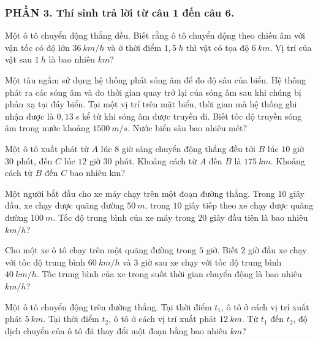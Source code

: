 \subsubsection*{PHẦN 3. Thí sinh trả lời từ câu 1 đến câu 6.}
\setcounter{ex}{0}
\begin{ex}%
Một ô tô chuyển động thẳng đều. Biết rằng ô tô chuyển động theo chiều âm với vận tốc có độ lớn $36\ km / h$ và ở thời điểm $1,5\ h$ thì vật có tọa độ $6\ km$. Vị trí của vật sau $1\ h$ là bao nhiêu $km$?
\loigiai{
}
\end{ex}
\begin{ex}%
Một tàu ngầm sử dụng hệ thống phát sóng âm để đo độ sâu của biển. Hệ thống phát ra các sóng âm và đo thời gian quay trở lại của sóng âm sau khi chúng bị phản xạ tại đáy biển. Tại một vị trí trên mặt biển, thời gian mà hệ thống ghi nhận được là $0,13\ s$ kể từ khi sóng âm được truyền đi. Biết tốc độ truyền sóng âm trong nước khoảng $1500\ m/s$. Nước biển sâu bao nhiêu mét? 
\loigiai{
}
\end{ex}
\begin{ex}%
Một ô tô xuất phát từ $A$ lúc $8$ giờ sáng chuyển động thẳng đều tới $B$ lúc $10$ giờ $30$ phút, đến $C$ lúc $12$ giờ $30$ phút. Khoảng cách từ $A$ đến $B$ là $175\ km$. Khoảng cách từ $B$ đến $C$ bao nhiêu km?
\loigiai{
}
\end{ex}
\begin{ex}
Một người bắt đầu cho xe máy chạy trên một đoạn đường thẳng. Trong $10$ giây đầu, xe chạy được quãng đường $50\ m$, trong $10$ giây tiếp theo xe chạy được quãng đường $100\ m$. Tốc độ trung bình của xe máy trong $20$ giây đầu tiên là bao nhiêu $km/h$?
\end{ex}
\begin{ex}
Cho một xe ô tô chạy trên một quãng đường trong $5$ giờ. Biết $2$ giờ đầu xe chạy với tốc độ trung bình $60\ km/h$ và $3$ giờ sau xe chạy với tốc độ trung bình $40\ km/h$. Tốc trung bình của xe trong suốt thời gian chuyển động là bao nhiêu $km/h$?
\end{ex}
\begin{ex}
Một ô tô chuyển động trên đường thẳng. Tại thời điểm $t_1$, ô tô ở cách vị trí xuất phát $5\ km$. Tại thời điểm $t_2$, ô tô ở cách vị trí xuất phát $12\ km$. Từ $t_1$ đến $t_2$, độ dịch chuyển của ô tô đã thay đổi một đoạn bằng bao nhiêu $km$?
\end{ex}

